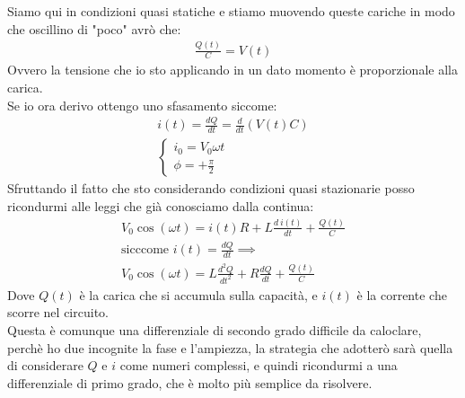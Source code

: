 \documentclass[a4paper, oneside]{article}
\begin{document}
Siamo qui in condizioni quasi statiche e stiamo muovendo queste cariche in modo che oscillino di "poco" avrò che:
\begin{gather*}
    \frac{Q(t)}{C} = V(t)
\end{gather*}
Ovvero la tensione che io sto applicando in un dato momento è proporzionale alla carica.\\
Se io ora derivo ottengo uno sfasamento siccome:
\begin{gather*}
    i(t) = \frac{dQ}{dt} = \frac{d}{dt} (V(t) C)\\
    \begin{cases}
        i_0 = V_0 \omega t\\
        \phi = +\frac{\pi}{2}
    \end{cases}
\end{gather*}
Sfruttando il fatto che sto considerando condizioni quasi stazionarie posso ricondurmi alle leggi che già conosciamo dalla continua:
\begin{gather*}
    V_0 \cos(\omega t) = i(t) R + L \frac{d \ i(t)}{d t} + \frac{Q(t)}{C}\\
    \text{sicccome } i(t) = \frac{dQ}{dt} \implies \\ V_0 \cos(\omega t) = L \frac{d^2 Q}{d t^2} + R \frac{dQ}{dt} + \frac{Q(t)}{C}
\end{gather*}
Dove $Q(t)$ è la carica che si accumula sulla capacità, e $i(t)$ è la corrente che scorre nel circuito.\\
Questa è comunque una differenziale di secondo grado difficile da caloclare, perchè ho due incognite la fase e l'ampiezza, la strategia 
che adotterò sarà quella di considerare $Q$ e $i$ come numeri complessi, e quindi ricondurmi a una differenziale di primo grado, che è molto più semplice da risolvere.\\
\end{document}
